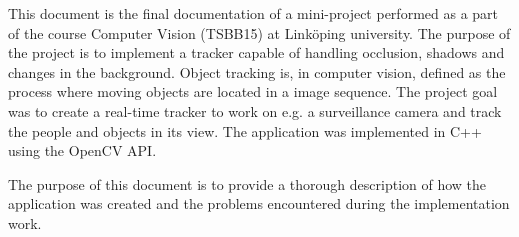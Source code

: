 This document is the final documentation of a mini-project performed as a part of the course Computer Vision (TSBB15) at Linköping university. The purpose of the project is to implement a tracker capable of handling occlusion, shadows and changes in the background. Object tracking is, in computer vision, defined as the process where moving objects are located in a image sequence. The project goal was to create a real-time tracker to work on e.g. a surveillance camera and track the people and objects in its view. The application was implemented in C++ using the OpenCV API.

The purpose of this document is to provide a thorough description of how the application was created and the problems encountered during the implementation work.
